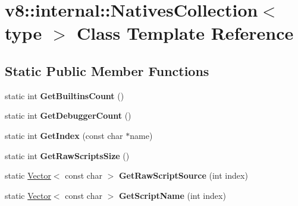 \hypertarget{classv8_1_1internal_1_1_natives_collection}{}\section{v8\+:\+:internal\+:\+:Natives\+Collection$<$ type $>$ Class Template Reference}
\label{classv8_1_1internal_1_1_natives_collection}
\subsection*{Static Public Member Functions}
\begin{DoxyCompactItemize}
\item 
\hypertarget{classv8_1_1internal_1_1_natives_collection_a81e3ac733b0a8f5e56af13b29b41e1cc}{}static int {\bfseries Get\+Builtins\+Count} ()\label{classv8_1_1internal_1_1_natives_collection_a81e3ac733b0a8f5e56af13b29b41e1cc}

\item 
\hypertarget{classv8_1_1internal_1_1_natives_collection_a2229a9268e522796a620c45d2fb16d48}{}static int {\bfseries Get\+Debugger\+Count} ()\label{classv8_1_1internal_1_1_natives_collection_a2229a9268e522796a620c45d2fb16d48}

\item 
\hypertarget{classv8_1_1internal_1_1_natives_collection_a7a8276ff535fb90fef0571092dbf56e1}{}static int {\bfseries Get\+Index} (const char $\ast$name)\label{classv8_1_1internal_1_1_natives_collection_a7a8276ff535fb90fef0571092dbf56e1}

\item 
\hypertarget{classv8_1_1internal_1_1_natives_collection_a73a9c7b8f8716b08e002b10111b7b0e5}{}static int {\bfseries Get\+Raw\+Scripts\+Size} ()\label{classv8_1_1internal_1_1_natives_collection_a73a9c7b8f8716b08e002b10111b7b0e5}

\item 
\hypertarget{classv8_1_1internal_1_1_natives_collection_a73256de0b83ae27aad1d66b81ac2c1d5}{}static \hyperlink{classv8_1_1internal_1_1_vector}{Vector}$<$ const char $>$ {\bfseries Get\+Raw\+Script\+Source} (int index)\label{classv8_1_1internal_1_1_natives_collection_a73256de0b83ae27aad1d66b81ac2c1d5}

\item 
\hypertarget{classv8_1_1internal_1_1_natives_collection_a5221c579647964d5872e507401f114a5}{}static \hyperlink{classv8_1_1internal_1_1_vector}{Vector}$<$ const char $>$ {\bfseries Get\+Script\+Name} (int index)\label{classv8_1_1internal_1_1_natives_collection_a5221c579647964d5872e507401f114a5}


\end{DoxyCompactItemize}
